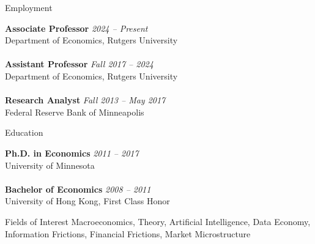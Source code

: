 \documentclass{resume} %
\begin{document}
\begin{rSection}{Employment}

	{\bf Associate Professor} \hfill {\em 2024 -- Present}
	\\ Department of Economics, Rutgers University
	\\
	\\{\bf Assistant Professor} \hfill {\em Fall 2017 -- 2024}
	\\ Department of Economics, Rutgers University
	\\
	\\{\bf Research Analyst} \hfill {\em Fall 2013 -- May 2017}
	\\ Federal Reserve Bank of Minneapolis

\end{rSection}

\begin{rSection}{Education}

{\bf Ph.D. in Economics} \hfill {\em 2011 -- 2017}
\\ University of Minnesota
\\
\\{\bf Bachelor of Economics} \hfill {\em 2008 -- 2011}
\\ University of Hong Kong, First Class Honor

\end{rSection}

\begin{rSection}{Fields of Interest}
Macroeconomics, Theory, Artificial Intelligence, Data Economy, Information Frictions, Financial Frictions, Market Microstructure
\end{rSection}
\end{document}
